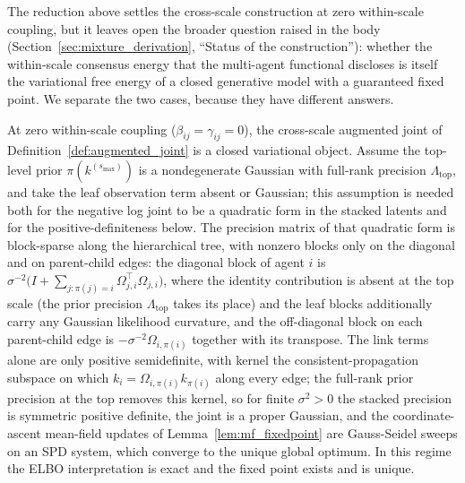 \documentclass[11pt]{article}
\begin{document}
The reduction above settles the cross-scale construction at zero within-scale coupling, but it leaves open the broader question raised in the body (Section~\ref{sec:mixture_derivation}, ``Status of the construction''): whether the within-scale consensus energy that the multi-agent functional discloses is itself the variational free energy of a closed generative model with a guaranteed fixed point. We separate the two cases, because they have different answers.

At zero within-scale coupling ($\beta_{ij} = \gamma_{ij} = 0$), the cross-scale augmented joint of Definition~\ref{def:augmented_joint} is a closed variational object. Assume the top-level prior $\pi(k^{(s_{\max})})$ is a nondegenerate Gaussian with full-rank precision $\Lambda_{\mathrm{top}}$, and take the leaf observation term absent or Gaussian; this assumption is needed both for the negative log joint to be a quadratic form in the stacked latents and for the positive-definiteness below. The precision matrix of that quadratic form is block-sparse along the hierarchical tree, with nonzero blocks only on the diagonal and on parent-child edges: the diagonal block of agent $i$ is $\sigma^{-2}\big(I + \sum_{j : \pi(j) = i}\Omega_{j,i}^\top\Omega_{j,i}\big)$, where the identity contribution is absent at the top scale (the prior precision $\Lambda_{\mathrm{top}}$ takes its place) and the leaf blocks additionally carry any Gaussian likelihood curvature, and the off-diagonal block on each parent-child edge is $-\sigma^{-2}\Omega_{i,\pi(i)}$ together with its transpose. The link terms alone are only positive semidefinite, with kernel the consistent-propagation subspace on which $k_i = \Omega_{i,\pi(i)}k_{\pi(i)}$ along every edge; the full-rank prior precision at the top removes this kernel, so for finite $\sigma^2 > 0$ the stacked precision is symmetric positive definite, the joint is a proper Gaussian, and the coordinate-ascent mean-field updates of Lemma~\ref{lem:mf_fixedpoint} are Gauss-Seidel sweeps on an SPD system, which converge to the unique global optimum. In this regime the ELBO interpretation is exact and the fixed point exists and is unique.
\end{document}
